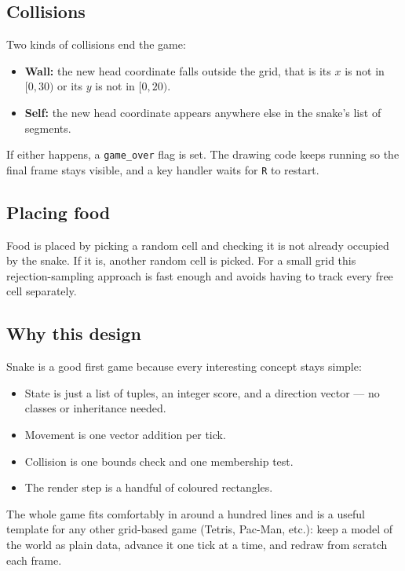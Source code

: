 \subsection*{Collisions}

Two kinds of collisions end the game:

\begin{itemize}
    \item \textbf{Wall:} the new head coordinate falls outside the grid,
    that is its $x$ is not in $[0, 30)$ or its $y$ is not in $[0, 20)$.
    \item \textbf{Self:} the new head coordinate appears anywhere else
    in the snake's list of segments.
\end{itemize}

If either happens, a \texttt{game\_over} flag is set. The drawing code
keeps running so the final frame stays visible, and a key handler waits
for \texttt{R} to restart.

\subsection*{Placing food}

Food is placed by picking a random cell and checking it is not already
occupied by the snake. If it is, another random cell is picked. For a
small grid this rejection-sampling approach is fast enough and avoids
having to track every free cell separately.

\subsection*{Why this design}

Snake is a good first game because every interesting concept stays
simple:

\begin{itemize}
    \item State is just a list of tuples, an integer score, and a
    direction vector --- no classes or inheritance needed.
    \item Movement is one vector addition per tick.
    \item Collision is one bounds check and one membership test.
    \item The render step is a handful of coloured rectangles.
\end{itemize}

The whole game fits comfortably in around a hundred lines and is a
useful template for any other grid-based game (Tetris, Pac-Man, etc.):
keep a model of the world as plain data, advance it one tick at a time,
and redraw from scratch each frame.

